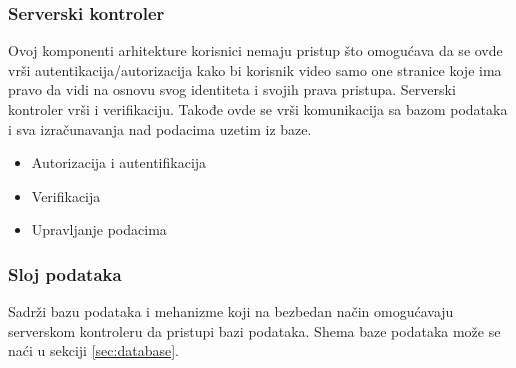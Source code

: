 \subsubsection{Serverski kontroler}
Ovoj komponenti arhitekture korisnici nemaju pristup što omogućava da se ovde vrši autentikacija/autorizacija kako bi korisnik video samo one stranice koje ima pravo da vidi na osnovu svog identiteta i svojih prava pristupa. Serverski kontroler vrši i verifikaciju. Takođe ovde se vrši komunikacija sa bazom podataka i sva izračunavanja nad podacima uzetim iz baze.
\begin{itemize}
    \item Autorizacija i autentifikacija
    \item Verifikacija
    \item Upravljanje podacima
\end{itemize}


\subsubsection{Sloj podataka}
Sadrži bazu podataka i mehanizme koji na bezbedan način omogućavaju serverskom kontroleru da pristupi bazi podataka. Shema baze podataka može se naći u sekciji \ref{sec:database}.
